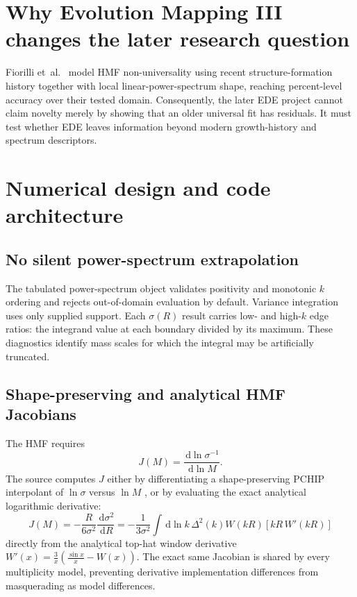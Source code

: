 \documentclass[11pt]{article}
\newcommand{\dd}{\,\mathrm d}
\begin{document}
\section{Why Evolution Mapping III changes the later research question}

Fiorilli et~al.\ \cite{FiorilliEtAl2026} model HMF non-universality using recent structure-formation history together with local linear-power-spectrum shape, reaching percent-level accuracy over their tested domain. Consequently, the later EDE project cannot claim novelty merely by showing that an older universal fit has residuals. It must test whether EDE leaves information beyond modern growth-history and spectrum descriptors.

\section{Numerical design and code architecture}

\subsection{No silent power-spectrum extrapolation}
The tabulated power-spectrum object validates positivity and monotonic $k$ ordering and rejects out-of-domain evaluation by default. Variance integration uses only supplied support. Each $\sigma(R)$ result carries low- and high-$k$ edge ratios: the integrand value at each boundary divided by its maximum. These diagnostics identify mass scales for which the integral may be artificially truncated.

\subsection{Shape-preserving and analytical HMF Jacobians}
The HMF requires
\begin{equation}
J(M)=\frac{\dd\ln\sigma^{-1}}{\dd\ln M}.
\end{equation}
The source computes $J$ either by differentiating a shape-preserving PCHIP interpolant of $\ln\sigma$ versus $\ln M$ \cite{FritschButland1984}, or by evaluating the exact analytical logarithmic derivative:
\begin{equation}
J(M) = -\frac{R}{6\sigma^2}\frac{\dd\sigma^2}{\dd R} = -\frac{1}{3\sigma^2}\int\dd\ln k\,\Delta^2(k)W(kR)\left[kR\,W'(kR)\right]
\end{equation}
directly from the analytical top-hat window derivative $W'(x) = \frac{3}{x}(\frac{\sin x}{x} - W(x))$. The exact same Jacobian is shared by every multiplicity model, preventing derivative implementation differences from masquerading as model differences.
\end{document}
